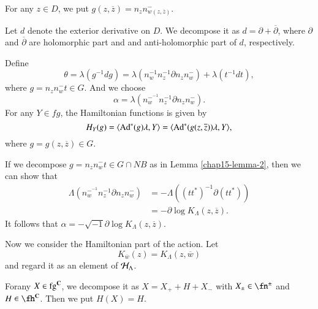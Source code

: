 For any $z \in D$, we put $g(z, \overline{z})=n_{z}n_{w(z, \overline{z})}^{-}$.

Let $d$ denote the exterior derivative on $D$. We decompose it as $d=\partial + \overline{\partial}$, where $\partial$ and $\overline{\partial}$ are holomorphic part and and anti-holomorphic part of $d$, respectively.

Define
$$
\theta= \lambda(g^{-1} dg)= \lambda(n_{w}^{-1} n_{z}^{-1}\partial n_{z}n_{w}^{-}) + \lambda(t^{-1}dt),
$$
where $g=n_{z}n_{w}^{-}t \in G$. And we choose
$$
\alpha = \lambda(n_{w}^{-^{-1}}n_{z}^{-1}\partial n_{z}n_{w}^{-}).
$$
For any $Y \in fg$, the Hamiltonian functions is given by
$$
H_{Y}(g)= \langle \operatorname{Ad}^{*}(g)\lambda, Y\rangle= \langle\operatorname{Ad}^{*}(g(z, \overline{z}))\lambda, Y\rangle,
$$
where $g=g(z, \overline{z})\in G$.

If we decompose $g = n_{z}n_{w}^{-}t \in G \cap N B$ as in Lemma \ref{chap15-lemma-2}, then we can show that
\begin{align*}
\Lambda(n_{w}^{-^{-1}}n_{z}^{-1}\partial n_{z}n_{w}^{-}) &= -\Lambda((tt^{*})^{-1}\partial(tt^{*}))\\
&= -\partial \log K_{\Lambda}(z, \overline{z}).
\end{align*}
It follows that $\alpha = -\sqrt{-1}\partial \log K_{\Lambda}(z, \overline{z})$.

Now we consider the Hamiltonian part of the action. Let
$$
K_{\overline{w}}(z)=K_{\Lambda}(z, \overline{w})
$$
and regard it as an element of $\mathcal{H}_{\Lambda}$.

For\pageoriginale any $X \in \operatorname{fg}^{\mathbf{C}}$, we decompose it as $X=X_{+}+H + X_{-}$ with $X_{\pm} \in \fn^{\pm}$ and $H \in \fh^{\bC}$. Then we put $H(X)=H$.

